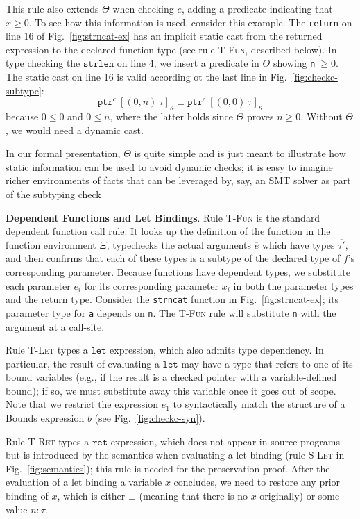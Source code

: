 \documentclass[conference]{IEEEtran}
\newcommand{\myparagraph}[1]{\textbf{#1}.\xspace}
\newcommand{\code}[1]{\lstinline|#1|}
\newcommand{\kw}[1]{\ensuremath{\mathtt{#1}}}
\newcommand{\estrlentext}{\ensuremath{\kw{strlen}}}
\newcommand{\tallarrayb}[2]{\ensuremath{[{#1}~{#2}]_{\kappa}}}
\newcommand{\tallarray}[3]{\tallarrayb{({#1},{#2})}{#3}}
\newcommand{\tptr}[2]{\ensuremath{\mathtt{ptr}^{#2}~{#1}}}
\newcommand{\tallarrayptr}[4]{{\tptr{\tallarray{#1}{#2}{#3}}{#4}}}
\newcommand{\evalue}[2]{\ensuremath{{#1}\!:\!{#2}}}
\newcommand{\elettext}{\ensuremath{\kw{let}}}
\newcommand{\erettext}{\ensuremath{\kw{ret}}}
\begin{document}
This rule also extends $\Theta$ when checking $e$, adding a predicate
indicating that $x\ge 0$. To see how this information is used,
consider this example.  The \code{return} on line 16 of
Fig.~\ref{fig:strncat-ex} has an implicit static cast from the
returned expression to the declared function type (see rule
\textsc{T-Fun}, described below). In type checking the $\estrlentext$
on line 4, we insert a predicate in $\Theta$ showing
\code{n}$\;\ge 0$.  The static cast on line 16 is valid according ot
the last line in Fig.~\ref{fig:checkc-subtype}:
{\small
$$
\tallarrayptr{0}{n}{\tau}{c} \sqsubseteq \tallarrayptr{0}{0}{\tau}{c}
$$
}
because $0 \leq 0$ and $0 \leq n$, where the latter holds since
$\Theta$ proves $n \ge 0$.  Without $\Theta$, we would need a
dynamic cast.

In our formal presentation, $\Theta$ is quite simple and is just meant
to illustrate how static information can be used to avoid dynamic
checks; it is easy to imagine richer environments of facts that can be
leveraged by, say, an SMT solver as part of the subtyping
check \cite{LiquidHaskell,Refinementlh}





\myparagraph{Dependent Functions and Let Bindings}
Rule \textsc{T-Fun} is the standard dependent function call rule. It
looks up the definition of the function in the function environment
$\Xi$, typechecks the actual arguments $\overline{e}$ which have
types $\overline{\tau'}$, and then confirms that each of these types
is a subtype of the declared type of $f$'s corresponding parameter. Because
functions have dependent types, we substitute each parameter $e_i$ for
its corresponding parameter $x_i$ in both the parameter types and the
return type. Consider the \code{strncat} function in
Fig.~\ref{fig:strncat-ex}; its parameter type for \code{a} 
depends on \code{n}. The \textsc{T-Fun} rule will substitute 
\code{n} with the argument at a call-site.

Rule \textsc{T-Let} types a $\elettext$ expression, which also admits
type dependency. In particular, the result of evaluating a $\elettext$
may have a type that refers to one of its bound variables (e.g., if
the result is a checked pointer with a variable-defined bound); if so,
we must substitute away this variable once it goes out of scope. Note
that we restrict the expression $e_1$ to syntactically match the
structure of a Bounds expression $b$ (see Fig.~\ref{fig:checkc-syn}).

Rule \textsc{T-Ret} types a $\erettext$ expression, which does not
appear in source programs but is introduced by the semantics when
evaluating a let binding (rule \textsc{S-Let} in
Fig.~\ref{fig:semantics}); this rule is needed for the preservation
proof. After the evaluation of a let binding a variable $x$ concludes,
we need to restore any prior binding of $x$, which is either
$\bot$ (meaning that there is no $x$ originally) or some value
$\evalue{n}{\tau}$.
\end{document}
